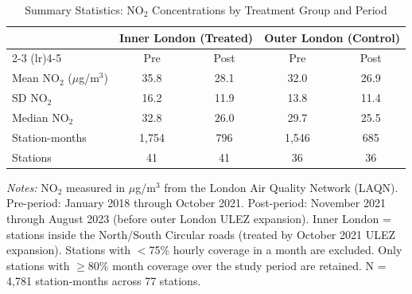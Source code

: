 \begin{table}[H]
\centering
\caption{Summary Statistics: NO$_2$ Concentrations by Treatment Group and Period}
\label{tab:summary}
\begin{threeparttable}
\begin{tabular}{lcccc}
\toprule
 & \multicolumn{2}{c}{Inner London (Treated)} & \multicolumn{2}{c}{Outer London (Control)} \\
\cmidrule(lr){2-3} \cmidrule(lr){4-5}
 & Pre & Post & Pre & Post \\
\midrule
Mean NO$_2$ ($\mu$g/m$^3$) & 35.8 & 28.1 & 32.0 & 26.9 \\
SD NO$_2$ & 16.2 & 11.9 & 13.8 & 11.4 \\
Median NO$_2$ & 32.8 & 26.0 & 29.7 & 25.5 \\
Station-months & 1,754 & 796 & 1,546 & 685 \\
Stations & 41 & 41 & 36 & 36 \\
\bottomrule
\end{tabular}
\begin{tablenotes}[flushleft]
\small
\item \textit{Notes:} NO$_2$ measured in $\mu$g/m$^3$ from the London Air Quality Network (LAQN). Pre-period: January 2018 through October 2021. Post-period: November 2021 through August 2023 (before outer London ULEZ expansion). Inner London = stations inside the North/South Circular roads (treated by October 2021 ULEZ expansion). Stations with $<$75\% hourly coverage in a month are excluded. Only stations with $\geq$80\% month coverage over the study period are retained. N = 4,781 station-months across 77 stations.
\end{tablenotes}
\end{threeparttable}
\end{table}
